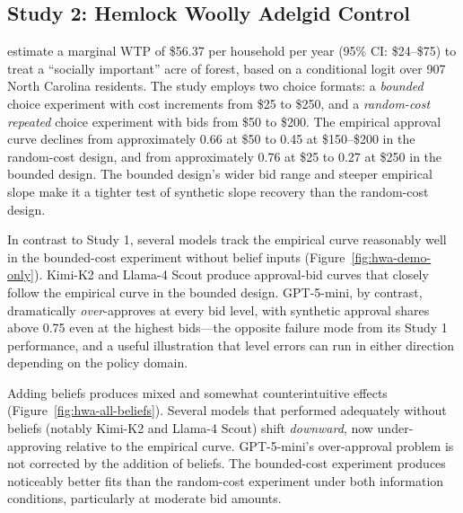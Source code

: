 \documentclass[12pt]{article}
\begin{document}
\subsection{Study 2: Hemlock Woolly Adelgid Control}\label{sec:results-hwa}

\textcite{Giguere2020} estimate a marginal WTP of \$56.37 per household
per year (95\% CI: \$24--\$75) to treat a ``socially important'' acre of
forest, based on a conditional logit over 907 North Carolina residents.
The study employs two choice formats: a \emph{bounded} choice experiment
with cost increments from \$25 to \$250, and a \emph{random-cost
repeated} choice experiment with bids from \$50 to \$200. The empirical
approval curve declines from approximately 0.66 at \$50 to 0.45 at
\$150--\$200 in the random-cost design, and from approximately 0.76 at
\$25 to 0.27 at \$250 in the bounded design. The bounded design's wider
bid range and steeper empirical slope make it a tighter test of synthetic
slope recovery than the random-cost design.

In contrast to Study 1, several models track the empirical curve
reasonably well in the bounded-cost experiment without belief inputs
(Figure~\ref{fig:hwa-demo-only}). Kimi-K2 and Llama-4 Scout produce
approval-bid curves that closely follow the empirical curve in the
bounded design. GPT-5-mini, by contrast, dramatically \emph{over}-approves
at every bid level, with synthetic approval shares above 0.75 even at
the highest bids---the opposite failure mode from its Study 1
performance, and a useful illustration that level errors can run in
either direction depending on the policy domain.


Adding beliefs produces mixed and somewhat counterintuitive effects
(Figure~\ref{fig:hwa-all-beliefs}). Several models that performed
adequately without beliefs (notably Kimi-K2 and Llama-4 Scout) shift
\emph{downward}, now under-approving relative to the empirical curve.
GPT-5-mini's over-approval problem is not corrected by the addition of
beliefs. The bounded-cost experiment produces noticeably better fits
than the random-cost experiment under both information conditions,
particularly at moderate bid amounts.
\end{document}
